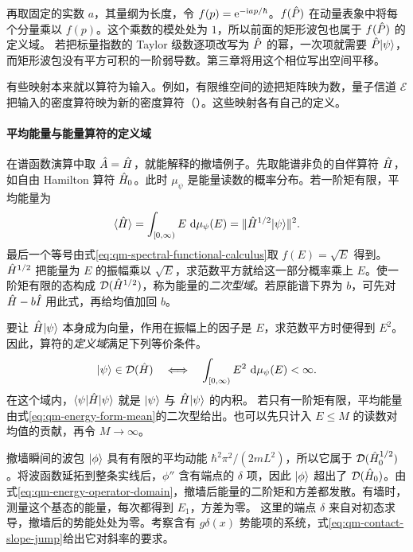 再取固定的实数 $a$，其量纲为长度，令 $f(p) = \mathop{}\!\mathrm{e}^{-\mathrm{i} ap/\hbar}$。$f(\hat{P})$ 在动量表象中将每个分量乘以 $f(p)$。这个乘数的模处处为 $1$，所以前面的矩形波包也属于 $f(\hat{P})$ 的定义域。
若把标量指数的 Taylor 级数逐项改写为 $\hat{P}$ 的幂，一次项就需要 $\hat{P}\lvert\psi\rangle$，而矩形波包没有平方可积的一阶弱导数。第三章将用这个相位写出空间平移。

有些映射本来就以算符为输入。例如，有限维空间的迹把矩阵映为数，量子信道 $\mathcal E$ 把输入的密度算符映为新的密度算符（）。这些映射各有自己的定义。

\paragraph{平均能量与能量算符的定义域}
在谱函数演算中取 $\hat{A} = \hat{H}$，就能解释的撤墙例子。先取能谱非负的自伴算符 $\hat{H}$，如自由 Hamilton 算符 $\hat{H}_0$。此时 $\mu_\psi$ 是能量读数的概率分布。若一阶矩有限，平均能量为
\begin{equation}
    \langle\hat{H}\rangle = \int_{[0,\infty)} E\,\mathop{}\!\mathrm{d}\mu_\psi(E)
        = \lVert\hat{H}^{1/2}\lvert\psi\rangle\rVert^2 .
    \label{eq:qm-energy-form-mean}
\end{equation}
最后一个等号由式\eqref{eq:qm-spectral-functional-calculus}取 $f(E) = \sqrt E$ 得到。$\hat{H}^{1/2}$ 把能量为 $E$ 的振幅乘以 $\sqrt E$，求范数平方就给这一部分概率乘上 $E$。使一阶矩有限的态构成 $\mathcal D(\hat{H}^{1/2})$，称为能量的\emph{二次型域}。若原能谱下界为 $b$，可先对 $\hat{H} - b\hat{I}$ 用此式，再给均值加回 $b$。

要让 $\hat{H}\lvert\psi\rangle$ 本身成为向量，作用在振幅上的因子是 $E$，求范数平方时便得到 $E^2$。因此，算符的\emph{定义域}满足下列等价条件\cite{teschl-forms}。
\begin{equation}
    \lvert\psi\rangle \in \mathcal D(\hat{H})
        \quad\Longleftrightarrow\quad
        \int_{[0,\infty)} E^2\,\mathop{}\!\mathrm{d}\mu_\psi(E) < \infty .
    \label{eq:qm-energy-operator-domain}
\end{equation}
在这个域内，$\langle\psi\vert\hat{H}\vert\psi\rangle$ 就是 $\lvert\psi\rangle$ 与 $\hat{H}\lvert\psi\rangle$ 的内积。
若只有一阶矩有限，平均能量由式\eqref{eq:qm-energy-form-mean}的二次型给出。也可以先只计入 $E \leq M$ 的读数对均值的贡献，再令 $M \to \infty$。

撤墙瞬间的波包 $\lvert\phi\rangle$ 具有有限的平均动能 $\hbar^2\pi^2/(2mL^2)$，所以它属于 $\mathcal D(\hat{H}_0^{1/2})$。将波函数延拓到整条实线后，$\phi''$ 含有端点的 $\delta$ 项，因此 $\lvert\phi\rangle$ 超出了 $\mathcal D(\hat{H}_0)$。由式\eqref{eq:qm-energy-operator-domain}，撤墙后能量的二阶矩和方差都发散。有墙时，测量这个基态的能量，每次都得到 $E_1$，方差为零。
这里的端点 $\delta$ 来自对初态求导，撤墙后的势能处处为零。考察含有 $g\delta(x)$ 势能项的系统，式\eqref{eq:qm-contact-slope-jump}给出它对斜率的要求。

